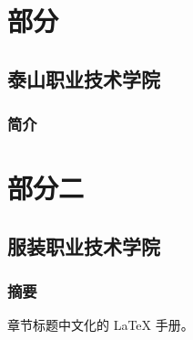 \documentclass[UTF8,heading=true]{ctexbook}
\begin{document}
\par \par\part{部分}
\chapter{泰山职业技术学院}
\section{简介}
\part{部分二}
\chapter{服装职业技术学院}
\section{摘要}
章节标题中文化的 \LaTeX{} 手册。
\end{document}
